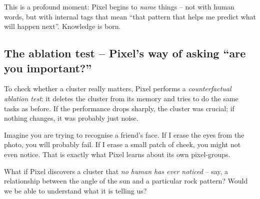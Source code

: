 This is a profound moment: Pixel begins to \emph{name} things – not
with human words, but with internal tags that mean “that pattern that
helps me predict what will happen next”.  Knowledge is born.

\subsection*{The ablation test – Pixel’s way of asking “are you important?”}

To check whether a cluster really matters, Pixel performs a
\emph{counterfactual ablation test}: it deletes the cluster from its
memory and tries to do the same tasks as before.  If the performance
drops sharply, the cluster was crucial; if nothing changes, it was
probably just noise.

Imagine you are trying to recognise a friend’s face.  If I erase the
eyes from the photo, you will probably fail.  If I erase a small patch
of cheek, you might not even notice.  That is exactly what Pixel
learns about its own pixel‑groups.

\begin{tcolorbox}[colback=orange!5, colframe=orange!60, title=\textbf{What if...?}]
What if Pixel discovers a cluster that \emph{no human has ever noticed}
– say, a relationship between the angle of the sun and a particular
rock pattern?  Would we be able to understand what it is telling us?
\end{tcolorbox}